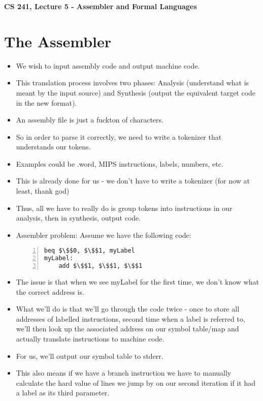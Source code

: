 \documentclass[12pt]{article}
\author{Clement Tsang}
\begin{document}
\begin{center}
\Large\textbf{CS 241, Lecture 5 - Assembler and Formal Languages}
\end{center}

\section{The Assembler}
\begin{itemize}
	\item We wish to input assembly code and output machine code.
    \item This translation process involves two phases: Analysis (understand what is meant by the input source) and Synthesis (output the equivalent target code in the new format).
    \item An assembly file is just a fuckton of characters.
    \item So in order to parse it correctly, we need to write a tokenizer that understands our tokens.
    \item Examples could be .word, MIPS instructions, labels, numbers, etc.  
    \item This is already done for us - we don't have to write a tokenizer (for now at least, thank god)
    \item Thus, all we have to really do is group tokens into instructions in our analysis, then in synthesis, output code.
    \item Assembler problem: Assume we have the following code:
        \begin{lstlisting}[mathescape, numbers=left, breaklines=true]
beq $\$$0, $\$$1, myLabel
myLabel:
    add $\$$1, $\$$1, $\$$1
        \end{lstlisting}
    \item The issue is that when we see myLabel for the first time, we don't know what the correct address is.
    \item What we'll do is that we'll go through the code twice - once to store all addresses of labelled instructions, second time when a label is referred to, we'll then look up the associated address on our symbol table/map and actually translate instructions to machine code.
    \item For us, we'll output our symbol table to stderr.
    \item This also means if we have a branch instruction we have to manually calculate the hard value of lines we jump by on our second iteration if it had a label as its third parameter.
\end{itemize}
\end{document}
